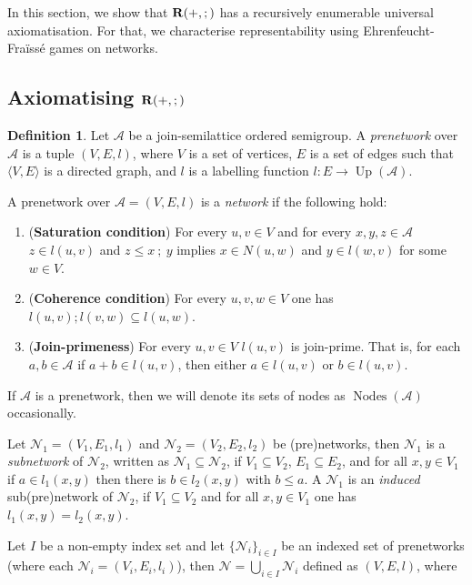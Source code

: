 \documentclass[a4paper]{article}
\theoremstyle{definition}
\newtheorem{definition}{Definition}
\theoremstyle{theorem}
\theoremstyle{proposition}
\theoremstyle{lemma}
\theoremstyle{ex}
\theoremstyle{corollary}
\theoremstyle{claim}
\begin{document}
In this section, we show that ${\bf R}(+, ;)$ has a recursively enumerable universal axiomatisation. For that, we characterise representability using Ehrenfeucht-Fra\"{i}ss\'{e} games on networks.

\subsection{Axiomatising ${\bf R}(+, ;)$}

\begin{definition} Let $\mathcal{A}$ be a join-semilattice ordered semigroup. A \emph{prenetwork} over $\mathcal{A}$ is a tuple $(V, E, l)$, where $V$ is a set of vertices, $E$ is a set of edges such that $\langle V, E \rangle$ is a directed graph, and $l$ is a labelling function $l : E \to \operatorname{Up}(\mathcal{A})$.

  A prenetwork over $\mathcal{A} = (V, E, l)$ is a \emph{network} if the following hold:
  \begin{enumerate}
    \item ({\bf Saturation condition}) For every $u, v \in V$ and for every $x,y,z \in \mathcal{A}$ $z \in l(u, v)$ and $z \leq x \: ; \: y$ implies $x \in N(u, w)$ and $y \in l(w, v)$ for some $w \in V$.
    \item ({\bf Coherence condition}) For every $u, v, w \in V$ one has $l(u, v) ; l(v, w) \subseteq l(u, w)$.
    \item ({\bf Join-primeness}) For every $u, v \in V$ $l(u,v)$ is join-prime. That is, for each $a, b \in \mathcal{A}$ if $a + b \in l(u,v)$, then either $a \in l(u,v)$ or $b \in l(u,v)$.
  \end{enumerate}
\end{definition}

If $\mathcal{A}$ is a prenetwork, then we will denote its sets of nodes as $\operatorname{Nodes}(\mathcal{A})$ occasionally.

Let $\mathcal{N}_1 = (V_1, E_1, l_1)$ and $\mathcal{N}_2 = (V_2, E_2, l_2)$ be (pre)networks, then $\mathcal{N}_1$ is a \emph{subnetwork} of $\mathcal{N}_2$, written as $\mathcal{N}_1 \subseteq \mathcal{N}_2$,
if $V_1 \subseteq V_2$, $E_1 \subseteq E_2$, and for all $x, y \in V_1$ if $a \in l_1(x, y)$ then there is $b \in l_2(x, y)$ with $b \leq a$. A $\mathcal{N}_1$ is an \emph{induced} sub(pre)network of $\mathcal{N}_2$, if $V_1 \subseteq V_2$ and for all $x, y \in V_1$ one has $l_1(x,y) = l_2(x,y)$.

Let $I$ be a non-empty index set and let $\{ \mathcal{N}_i \}_{i \in I}$ be an indexed set of prenetworks (where each $\mathcal{N}_i = (V_i, E_i, l_i)$), then $\mathcal{N} = \bigcup \limits_{i \in I} \mathcal{N}_i$ defined as $(V, E, l)$, where
\end{document}
